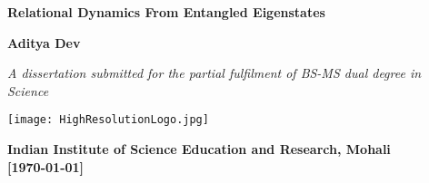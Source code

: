 \begin{titlepage}

    \begin{center}
        \sffamily
        \LARGE
        \textbf{Relational Dynamics From Entangled Eigenstates}
        \vspace{1cm}
        
        \Large
        \textbf{Aditya Dev}
    
        \vspace{1cm}
        \large
        
        \textit{A dissertation submitted for the partial fulfilment of
        BS-MS dual degree in Science}
        
        \vspace{3.5cm}
    
        \texttt{[image: HighResolutionLogo.jpg]}
        \vspace{1cm}
        
        \large
        \textbf{Indian Institute of Science Education and Research, Mohali}\\
        \large
        \textbf{[\today]} 
    
    \end{center}
    
    
    \end{titlepage}